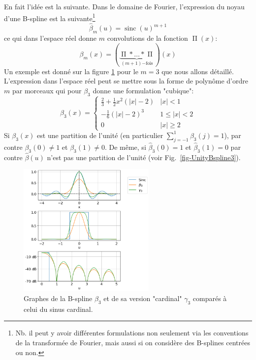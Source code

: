 \documentclass[11pt,twoside]{article}
\DeclareMathOperator{\sinc}{sinc}
\DeclareMathOperator{\boxcar}{{\mbox{$\Pi$}}}
\begin{document}
En fait l'idée est la suivante. Dans le domaine de Fourier, l'expression du noyau d'une B-spline est la suivante\footnote{Nb. il peut y avoir différentes formulations non seulement via les conventions de la transformée de Fourier, mais aussi si on considère des B-splines centrées ou non.}
\begin{equation}
\hat{\beta}_m(u) = \sinc(u)^{m+1}
\end{equation}
ce qui dans l'espace réel donne $m$ convolutions de la fonction $\boxcar(x)$:
\begin{equation}
\beta_m(x) = (\underbrace{\boxcar \ast \dots \ast \boxcar}_{(m+1)\mathrm{-fois}})(x)
\end{equation}
Un exemple est donné sur la figure \ref{fig-Bspline3-kernel} pour le $m=3$ que nous allons détaillé. L'expression dans l'espace réel peut se mettre sous la forme de polynôme d'ordre $m$ par morceaux qui pour $\beta_3$ donne une formulation "cubique":
\begin{equation}
\beta_3(x) = \begin{cases}
\frac{2}{3}+\frac{1}{2} x^2(|x|-2) & |x|< 1 \\
-\frac{1}{6} (|x|-2)^3 & 1\leq |x|<2 \\
0 & |x| \geq 2
\end{cases}
\end{equation}
Si $\beta_3(x)$ est une partition de l'unité (en particulier $\sum_{j=-1}^1 \beta_3(j)=1$), par contre $\beta_3(0)\neq 1$  et $\beta_3(1)\neq 0$. De même, si $\hat{\beta}_3(0)=1$ et $\hat{\beta}_3(1)=0$ par contre  $\hat{\beta}(u)$ n'est pas une partition de l'unité (voir Fig.~\ref{fig-UnityBspline3}).
%
\begin{figure}
\centering
\includegraphics[width=0.6\textwidth]{fig7.png}
\caption{Graphes de la B-spline $\beta_3$ et de sa version "cardinal" $\gamma_3$ comparés à celui du sinus cardinal.}
\label{fig-Bspline3-kernel}
\end{figure}
\end{document}

